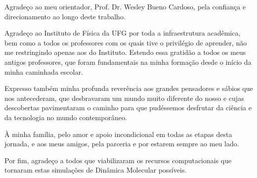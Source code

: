 Agradeço ao meu orientador, Prof. Dr. Wesley Bueno Cardoso, pela confiança e direcionamento ao longo deste trabalho.

Agradeço ao Instituto de Física da UFG por toda a infraestrutura acadêmica, bem como a todos os professores com os quais tive o privilégio de aprender, não me restringindo apenas aos do Instituto. Estendo essa gratidão a todos os meus antigos professores, que foram fundamentais na minha formação desde o início da minha caminhada escolar.

Expresso também minha profunda reverência aos grandes pensadores e sábios que nos antecederam, que desbravaram um mundo muito diferente do nosso e cujas descobertas pavimentaram o caminho para que pudéssemos desfrutar da ciência e da tecnologia no mundo contemporâneo.

À minha família, pelo amor e apoio incondicional em todas as etapas desta jornada, e aos meus amigos, pela parceria e por estarem sempre ao meu lado.

Por fim, agradeço a todos que viabilizaram os recursos computacionais que tornaram estas simulações de Dinâmica Molecular possíveis.

\newpage
